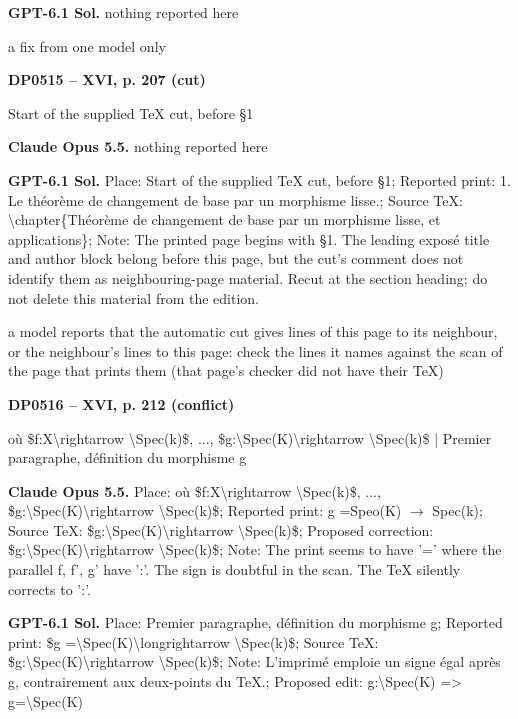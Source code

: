 \textbf{GPT-6.1 Sol.} nothing reported here\par
a fix from one model only\par
\par\noindent\hypertarget{DP0515}{}\textbf{DP0515 -- XVI, p. 207 (cut)}\par
Start of the supplied TeX cut, before §1\par
\textbf{Claude Opus 5.5.} nothing reported here\par
\textbf{GPT-6.1 Sol.} Place: Start of the supplied TeX cut, before §1; Reported print: 1. Le théorème de changement de base par un morphisme lisse.; Source TeX: \textbackslash{}chapter\{Théorème de changement de base par un morphisme lisse, et applications\}; Note: The printed page begins with §1. The leading exposé title and author block belong before this page, but the cut's comment does not identify them as neighbouring-page material. Recut at the section heading; do not delete this material from the edition.\par
a model reports that the automatic cut gives lines of this page to its neighbour, or the neighbour's lines to this page: check the lines it names against the scan of the page that prints them (that page's checker did not have their TeX)\par
\par\noindent\hypertarget{DP0516}{}\textbf{DP0516 -- XVI, p. 212 (conflict)}\par
où \$f:X\textbackslash{}rightarrow \textbackslash{}Spec(k)\$, ..., \$g:\textbackslash{}Spec(K)\textbackslash{}rightarrow \textbackslash{}Spec(k)\$ | Premier paragraphe, définition du morphisme g\par
\textbf{Claude Opus 5.5.} Place: où \$f:X\textbackslash{}rightarrow \textbackslash{}Spec(k)\$, ..., \$g:\textbackslash{}Spec(K)\textbackslash{}rightarrow \textbackslash{}Spec(k)\$; Reported print: g =\allowbreak  Speo(K) \ensuremath{\longrightarrow} Spec(k); Source TeX: \$g:\textbackslash{}Spec(K)\textbackslash{}rightarrow \textbackslash{}Spec(k)\$; Proposed correction: \$g:\textbackslash{}Spec(K)\textbackslash{}rightarrow \textbackslash{}Spec(k)\$; Note: The print seems to have '=\allowbreak ' where the parallel f, f', g' have ':'. The sign is doubtful in the scan. The TeX silently corrects to ':'.\par
\textbf{GPT-6.1 Sol.} Place: Premier paragraphe, définition du morphisme g; Reported print: \$g =\allowbreak  \textbackslash{}Spec(K)\textbackslash{}longrightarrow \textbackslash{}Spec(k)\$; Source TeX: \$g:\textbackslash{}Spec(K)\textbackslash{}rightarrow \textbackslash{}Spec(k)\$; Note: L'imprimé emploie un signe égal après g, contrairement aux deux-points du TeX.; Proposed edit: g:\textbackslash{}Spec(K) =\allowbreak > g=\allowbreak \textbackslash{}Spec(K)\par
